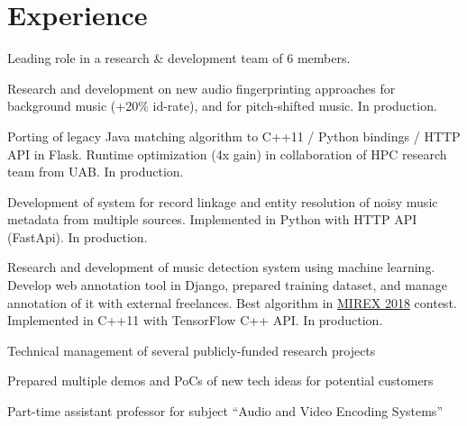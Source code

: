 \documentclass[]{deedy-resume-openfont}
\begin{document}
\begin{minipage}[t]{0.66\textwidth} 


\section{Experience}
\vspace{\topsep} %
\begin{tightemize}
\item Leading role in a research \& development team of 6 members.
\item Research and development on new audio fingerprinting approaches for background music (+20\% id-rate), and for pitch-shifted music. In production.
\item Porting of legacy Java matching algorithm to C++11 / Python bindings / HTTP API in Flask. Runtime optimization (4x gain) in collaboration of HPC research team from UAB. In production.
\item Development of system for record linkage and entity resolution of noisy music metadata from multiple sources. Implemented in Python with HTTP API (FastApi). In production.
\item Research and development of music detection system using machine learning. Develop web annotation tool in Django, prepared training dataset, and manage annotation of it with external freelances. Best algorithm in \href{https://www.music-ir.org/mirex/wiki/2018:Music_and_or_Speech_Detection_Results}{MIREX 2018} contest. Implemented in C++11 with TensorFlow C++ API. In production.
\item Technical management of several publicly-funded research projects
\item Prepared multiple demos and PoCs of new tech ideas for potential customers
\end{tightemize}
\sectionsep

\begin{tightemize}
\item Part-time assistant professor for subject ``Audio and Video Encoding Systems''
\end{tightemize}
\sectionsep


\end{minipage}
\end{document}

